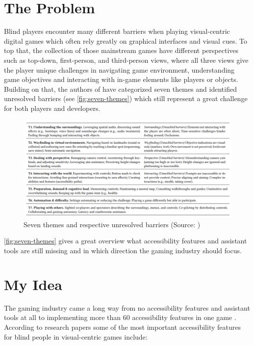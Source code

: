 \documentclass[sigconf,natbib=false,10pt]{acmart}
\begin{document}
	\section{The Problem}
	Blind players encounter many different barriers when playing visual-centric digital games which often rely greatly on graphical interfaces and visual cues. 
	To top that, the collection of those mainstream games have different perspectives such as top-down, first-person, and third-person views, where all three views give the player unique challenges in navigating game environment, understanding game objectives and interacting with in-game elements like players or objects.
	Building on that, the authors of \textcite{goncalves_my_2023} have categorized seven themes and identified unresolved barriers (see \autoref{fig:seven-themes}) which still represent a great challenge for both players and developers.
	
	\begin{figure}[ht]
		\centering
		\includegraphics[scale=0.6,width=\textwidth]{assets/seven-themes.png}
		\caption{Seven themes and respective unresolved barriers (Source: \textcite{goncalves_my_2023})}
		\label{fig:seven-themes}
	\end{figure}

	\autoref{fig:seven-themes} gives a great overview what accessibility features and assistant tools are still missing and in which direction the gaming industry should focus.
	
	\section{My Idea}
	The gaming industry came a long way from no accessibility features and assistant tools at all to implementing more than 60 accessibility features in one game \cite{playstation_last_2020}.
	According to research papers \cite{goncalves_my_2023, grammenos_designing_2009, grammenos_game_2008, araujo_mobile_2017} some of the most important accessibility features for blind people in visual-centric games include:
	
\end{document}
